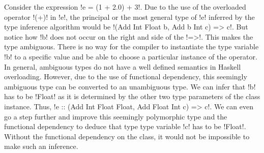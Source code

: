 \documentclass[format=sigplan,manuscript,review,screen,nonacm,margin=1in]{acmart}
\begin{document}
Consider the expression !e = (1 + 2.0) + 3!. Due to the use of the overloaded operator !(+)! in !e!,
the principal or the most general type of !e! inferred by the type inference algorithm would be
!(Add Int Float b, Add b Int c) => c!. But notice how !b! does not occur on the right and
side of the !=>!. This makes the type ambiguous. There is no way for the compiler
to instantiate the type variable !b! to a specific value and
be able to choose a particular instance of the operator. In general, ambiguous types do not have
a well defined semantics in Haskell overloading. However, due to the use of functional dependency,
this seemingly ambiguous type can be converted to an unambiguous type.
We can infer that !b! has to be !Float! as it is determined by the other two type parameters of the class instance.
Thus, !e :: (Add Int Float Float, Add Float Int c) => c!.
We can even go a step further and improve this seemingly polymorphic type and the functional dependency
to deduce that type type variable !c! has to be !Float!.
Without the functional dependency on the class, it would not be impossible
to make such an inference.
\end{document}

